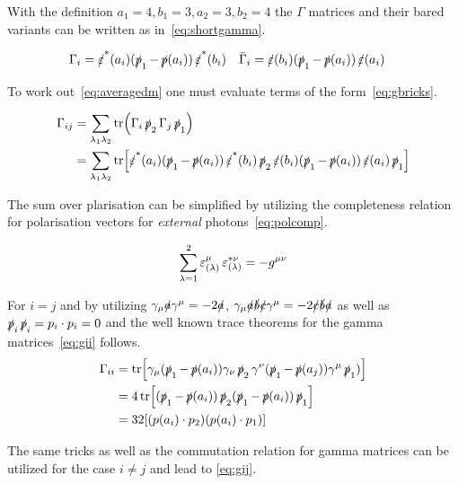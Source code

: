 With the definition \(a_1=4,b_1=3,a_2=3,b_2=4\) the \(\Gamma\)
matrices and their bared variants can be written as in~\eqref{eq:shortgamma}.

\begin{align}
  \label{eq:shortgamma}
  \Gamma_i &= \pses(a_i)(\ps_1 - \ps(a_i))\pses(b_i) & \bar{\Gamma}_i &= \pes(b_i)(\ps_1 - \ps(a_i))\pes(a_i)
\end{align}

To work out~\eqref{eq:averagedm} one must evaluate terms of the
form~\eqref{eq:gbricks}.

\begin{equation}
  \label{eq:gbricks}
  \begin{split}
    \Gamma_{ij} &= \sum_{\lambda_1\lambda_2}
    \tr(\Gamma_i\ps_2\Gamma_j\ps_1)\\
    &= \sum_{\lambda_1\lambda_2}
    \tr[\pses(a_i)(\ps_1-\ps(a_i))\pses(b_i)\ps_2\pes(b_i)(\ps_1 -
    \ps(a_i))\pes(a_i)\ps_1]
  \end{split}
\end{equation}

The sum over plarisation can be simplified by utilizing the
completeness relation for polarisation vectors for \emph{external}
photons~\eqref{eq:polcomp}.

\begin{equation}
  \label{eq:polcomp}
  \sum_{\lambda=1}^{2}\pe_{(\lambda)}^\mu\pe_{(\lambda)}^{*\nu} = -g^{\mu\nu}
\end{equation}

For \(i=j\) and by utilizing \(\gamma_\mu\sl{a}\gamma^\mu=-2\sl{a}\),
 \(\gamma_\mu\sl{a}\sl{b}\sl{c}\gamma^\mu=-2\sl{c}\sl{b}\sl{a}\) as
well as \(\ps_i\ps_i=p_i\cdot p_i = 0\) and the well known trace
theorems for the gamma matrices~\eqref{eq:gii} follows.
\begin{equation}
  \label{eq:gii}
  \begin{split}
\Gamma_{ii} &=
\tr[\gamma_\mu(\ps_1-\ps(a_i))\gamma_\nu\ps_2\gamma^\nu(\ps_1-\ps(a_j))\gamma^\mu\ps_1)]
\\
&= 4\tr[(\ps_1-\ps(a_i))\ps_2(\ps_1-\ps(a_i))\ps_1]\\
&= 32\qty[(p(a_i)\cdot p_2)(p(a_i)\cdot p_1)]
\end{split}
\end{equation}

The same tricks as well as the commutation relation for gamma matrices
can be utilized for the case \(i\neq j\) and lead to
\ref{eq:gij}.

